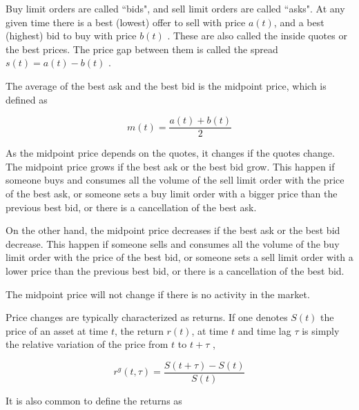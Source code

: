 Buy limit orders are called ``bids", and sell limit orders are called ``asks".
At any given time there is a best (lowest) offer to sell with price
$a\left(t\right)$, and a best (highest) bid to buy with price
$b\left(t\right)$ \cite{subtle_nature}. These are also called the inside quotes
or the best prices. The price gap between them is called the spread
$s\left(t\right) = a\left(t\right)-b\left(t\right)$
\cite{subtle_nature,Bouchaud_2004,large_prices_changes}.

The average of the best ask and the best bid is the midpoint price, which is
defined as \cite{subtle_nature,Bouchaud_2004,large_prices_changes}

\begin{equation}\label{eq:midpoint_price}
    m\left(t\right)=\frac{a\left(t\right)+b\left(t\right)}{2}
\end{equation}

As the midpoint price depends on the quotes, it changes if the quotes change.
The midpoint price grows if the best ask or the best bid grow. This happen if
someone buys and consumes all the volume of the sell limit order with the price
of the best ask, or someone sets a buy limit order with a bigger price than the
previous best bid, or there is a cancellation of the best ask.

On the other hand, the midpoint price decreases if the best ask or the best bid
decrease. This happen if someone sells and consumes all the volume of the buy
limit order with the price of the best bid, or someone sets a sell limit order
with a lower price than the previous best bid, or there is a cancellation of
the best bid.

The midpoint price will not change if there is no activity in the market.

Price changes are typically characterized as returns. If one denotes
$S\left( t\right)$ the price of an asset at time $t$, the return
$r\left(t\right)$, at time $t$ and time lag $\tau$ is simply the relative
variation of the price from $t$ to $t + \tau$
\cite{subtle_nature,empirical_facts},

\begin{equation}\label{eq:return_general}
    r^{g} \left(t, \tau \right) = \frac{S\left(t + \tau\right)
    - S\left(t\right)}{S\left(t\right)}
\end{equation}

It is also common to define the returns as
\cite{dissecting_cross,subtle_nature,empirical_facts,empirical_properties,large_prices_changes,theory_market_impact,spread_changes_affect,fluctions_market_friction}

